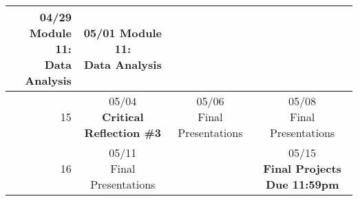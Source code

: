\documentclass[11pt]{article}
\begin{document}
\begin{tabular}{| r | c | c | c |}
	\makecell{04/29 Module 11: \\Data Analysis} &
	\makecell{05/01 Module 11: \\Data Analysis} \\
	\hline 15 &
	\makecell{05/04 \\ \textbf{Critical Reflection \#3}} &
	\makecell{05/06 \\Final Presentations} &
	\makecell{05/08 \\Final Presentations} \\
	\hline 16 &
	\makecell{05/11 \\Final Presentations} & 
	\makecell{} & 
	\makecell{05/15 \\\textbf{Final Projects Due 11:59pm}}\\
	\hline
\end{tabular}
\end{document}
